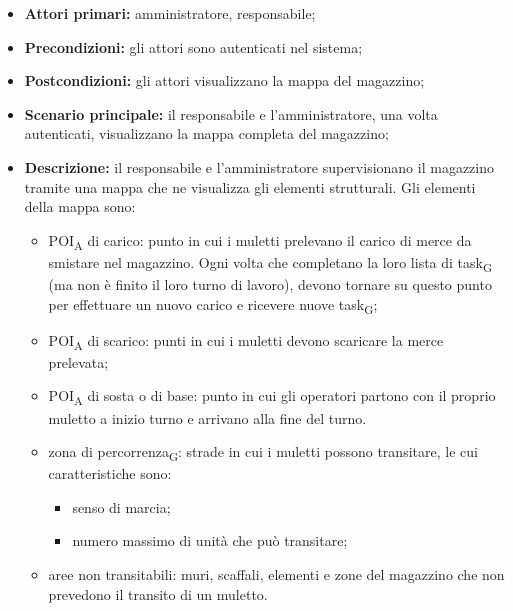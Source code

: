 \begin{itemize}
	\item 	\textbf{Attori primari:} amministratore, responsabile;
	\item 	\textbf{Precondizioni:} gli attori sono autenticati nel sistema;
	\item 	\textbf{Postcondizioni:} gli attori visualizzano la mappa del magazzino;
	\item 	\textbf{Scenario principale:} il responsabile e l'amministratore, una volta autenticati, visualizzano la mappa completa del magazzino;
	\item 	\textbf{Descrizione:} il responsabile e l'amministratore supervisionano il magazzino tramite una mappa che ne visualizza gli elementi strutturali. Gli elementi della mappa sono:
	\begin{itemize}
		\item POI\textsubscript{A} di carico:  punto in cui i muletti prelevano il carico di merce da smistare nel magazzino. Ogni volta che completano la loro lista di task\textsubscript{G} (ma non è finito il loro turno di lavoro), devono tornare su questo punto per effettuare un nuovo carico e ricevere nuove task\textsubscript{G};
		\item POI\textsubscript{A} di scarico: punti in cui i muletti devono scaricare la merce prelevata;
		\item POI\textsubscript{A} di sosta o di base: punto in cui gli operatori partono con il proprio muletto a inizio turno e arrivano alla fine del turno.
		\item zona di percorrenza\textsubscript{G}: strade in cui i muletti possono transitare, le cui caratteristiche sono:
		\begin{itemize}
			\item senso di marcia;
			\item numero massimo di unità che può transitare;
		\end{itemize}
		\item aree non transitabili: muri, scaffali, elementi e zone del magazzino che non prevedono il transito di un muletto.
	\end{itemize}

\end{itemize}



